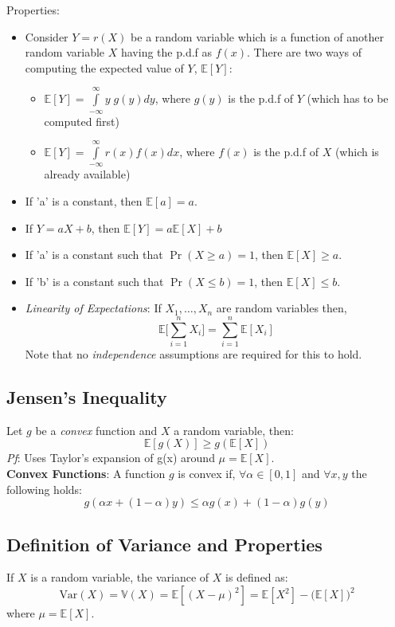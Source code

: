 \documentclass[english, 11pt]{article}
\begin{document}
Properties:
\begin{itemize}
\item Consider $Y = r(X)$ be a random variable which is a function of another random variable $X$ having the p.d.f as $f(x)$. There are two ways of computing the expected value of $Y$, $\mathbb{E}[Y]$:
\begin{itemize}
\item $\mathbb{E}[Y] = \int\limits_{-\infty}^{\infty} y \; g(y) dy$, where $g(y)$ is the p.d.f of $Y$ (which has to be computed first)
\item $\mathbb{E}[Y] = \int\limits_{-\infty}^{\infty} r(x) f(x) dx$, where $f(x)$ is the p.d.f of $X$ (which is already available)
\end{itemize}
\item If 'a' is a constant, then $\mathbb{E}[a] = a$.
\item If $Y = a X + b$, then $\mathbb{E}[Y] = a \mathbb{E}[X] + b$
\item If 'a' is a constant such that $\Pr(X \ge a) = 1$, then $\mathbb{E}[X] \ge a $.
\item If 'b' is a constant such that $\Pr(X \le b) = 1$, then $\mathbb{E}[X] \le b $.
\item {\it Linearity of Expectations}: If $X_1, \ldots, X_n$ are random variables then,
\[ \mathbb{E}\bigg[\sum_{i=1}^n X_i \bigg] = \sum_{i=1}^n \mathbb{E}[X_i] \]
Note that no {\it independence} assumptions are required for this to hold.
\end{itemize}

\subsection{Jensen's Inequality}
Let $g$ be a {\it convex} function and $X$ a random variable, then:
\[ \mathbb{E}[g(X)] \ge g(\mathbb{E}[X]) \]
{\it Pf}: Uses Taylor's expansion of g(x) around $\mu = \mathbb{E}[X]$. \\


{\bf Convex Functions}: A function $g$ is convex if, $\forall \alpha \in [0, 1]$ and $\forall x, y$ the following holds:
\[ g(\alpha x + (1 - \alpha) y) \le \alpha g(x) + (1 - \alpha) g(y) \]

\subsection{Definition of Variance and Properties}
If $X$ is a random variable, the variance of $X$ is defined as:
\[ \text{Var}(X) = \mathbb{V}(X) = \mathbb{E}[(X-\mu)^2] = \mathbb{E}[X^2] - \big( \mathbb{E}[X] \big)^2 \]
where $\mu = \mathbb{E}[X]$.\\
\end{document}
